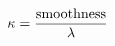 \documentclass[preview]{standalone}
\begin{document}
\begin{align*}
\special{dvisvgm:raw <g id='unique000'>}\kappa = \frac{\text{smoothness}}{\lambda}\special{dvisvgm:raw </g>}
\end{align*}
\end{document}
